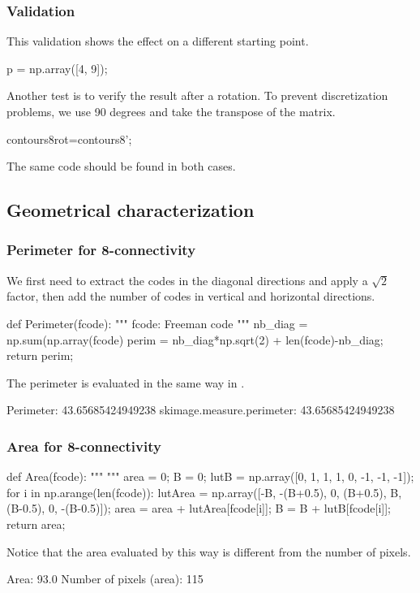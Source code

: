 \subsubsection{Validation}
This validation shows the effect on a different starting point.

\begin{python}
p = np.array([4, 9]);
\end{python}

Another test is to verify the result after a rotation. To prevent discretization problems, we use 90 degrees and take the transpose of the matrix.

\begin{python}
contours8rot=contours8';
\end{python}

The same code should be found in both cases.

\subsection{Geometrical characterization}
\subsubsection{Perimeter for 8-connectivity}
We first need to extract the codes in the diagonal directions and apply a $\sqrt{2}$ factor, then add the number of codes in vertical and horizontal directions.

\begin{python}
def Perimeter(fcode):
    """
    fcode: Freeman code
    """
    nb_diag = np.sum(np.array(fcode)%
    perim = nb_diag*np.sqrt(2) + len(fcode)-nb_diag;
    return perim;
\end{python}

The perimeter is evaluated in the same way in .
\begin{sh}Perimeter:  43.65685424949238
skimage.measure.perimeter:  43.65685424949238
\end{sh}


\subsubsection{Area for 8-connectivity}

\begin{python}
def Area(fcode):
    """
    """
    area = 0;
    B = 0;
    lutB = np.array([0, 1, 1, 1, 0, -1, -1, -1]);
    for i in np.arange(len(fcode)):
        lutArea = np.array([-B, -(B+0.5), 0, (B+0.5), B, (B-0.5), 0, -(B-0.5)]);
        area = area + lutArea[fcode[i]];
        B = B + lutB[fcode[i]];
    return area;
\end{python}

Notice that the area evaluated by this way is different from the number of pixels.
\begin{sh}
Area:  93.0
Number of pixels (area):  115
\end{sh}
